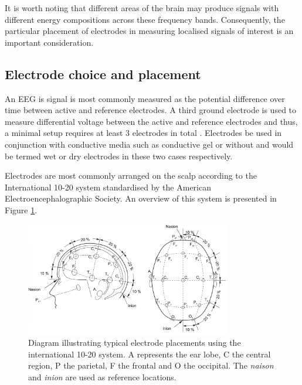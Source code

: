 It is worth noting that different areas of the brain may produce signals with different energy compositions across these frequency bands. Consequently, the particular placement of electrodes in measuring localised signals of interest is an important consideration.

\subsection{Electrode choice and placement}
An EEG is signal is most commonly measured as the potential difference over time between active and reference electrodes. A third ground electrode is used to measure differential voltage between the active and reference electrodes and thus, a minimal setup requires at least 3 electrodes in total \cite{bci-survey-nicolas-alonso}. Electrodes be used in conjunction with conductive media such as conductive gel or without and would be termed wet or dry electrodes in these two cases respectively. 

Electrodes are most commonly arranged on the scalp according to the International 10-20 system standardised by the American Electroencephalographic Society. An overview of this system is presented in Figure \ref{fig:10-20-positions}.

\begin{figure}[h]
    \centering
    \includegraphics[width=0.8\textwidth]{10-20-electrode.png}
    \caption[Electrode positions according to the 10-20 system]{Diagram illustrating typical electrode placements using the international 10-20 system. A represents the ear lobe, C the central region, P the parietal, F the frontal and O the occipital. The \textit{naison} and \textit{inion} are used as reference locations.}
    \label{fig:10-20-positions}
\end{figure}

